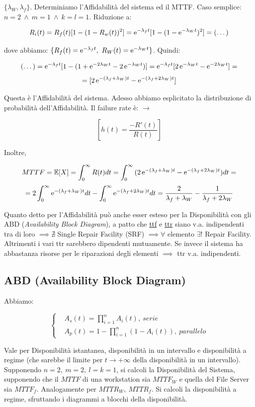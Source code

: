 $\{\lambda_W,\lambda_f\}$. Determiniamo l'Affidabilità del sistema ed il MTTF. Caso semplice: $n=2\ \land\ m=1\ \land\ k=l=1$. Riduzione a:

\[
	R_i(t) = R_f(t)[1-(1-R_w(t))^2] = \mathop{}\!\mathrm{e}^{-\lambda_ft}[1-(1-\mathop{}\!\mathrm{e}^{-\lambda_Wt})^2] = (\dots)
\]

dove abbiamo: $\{R_f(t)=\e^{-\lambda_ft},\ R_W(t)=\e^{-\lambda_Wt}\}$. Quindi:

\[
	(\dots) = \mathop{}\!\mathrm{e}^{-\lambda_ft}[1-(1+\mathop{}\!\mathrm{e}^{-2\lambda_Wt}-2\mathop{}\!\mathrm{e}^{-\lambda_Wt})] = \mathop{}\!\mathrm{e}^{-\lambda_ft}[2\mathop{}\!\mathrm{e}^{-\lambda_Wt} - \mathop{}\!\mathrm{e}^{-2\lambda_Wt}] =
\]
\[
	= [2\mathop{}\!\mathrm{e}^{-(\lambda_f+\lambda_W)t} - \mathop{}\!\mathrm{e}^{-(\lambda_f+2\lambda_W)t}]
\]

Questa è l'Affidabilità del sistema. Adesso abbiamo esplicitato la distribuzione di probabilità dell'Affidabilità. Il failure rate è: $\rightarrow$

\[
	[h(t) = \frac{-R'(t)}{R(t)}]
\]

Inoltre,

\[
	MTTF = \operatorname{\mathbb{E}}[X] = \int_0^\infty{R(t)dt} = \int_0^\infty{(2\mathop{}\!\mathrm{e}^{-(\lambda_f+\lambda_W)t} - \mathop{}\!\mathrm{e}^{-(\lambda_f+2\lambda_W)t})dt} =
\]
\[
	= 2\int_0^\infty{\mathop{}\!\mathrm{e}^{-(\lambda_f+\lambda_W)t}dt} -\int_0^\infty{\mathop{}\!\mathrm{e}^{-(\lambda_f+2\lambda_W)t}dt} = \frac{2}{\lambda_f+\lambda_W}-\frac{1}{\lambda_f+2\lambda_W}
\]

Quanto detto per l'Affidabilità può anche esser esteso per la Disponibilità con gli ABD (\textit{Availability Block Diagram}), a patto che \underline{ttf} e \underline{ttr} siano v.a. indipendenti tra di loro $\implies \nexists$ Single Repair Facility (SRF) $\implies \forall$ elemento $\exists!$ Repair Facility. Altrimenti i vari ttr sarebbero dipendenti mutuamente. Se invece il sistema ha abbastanza risorse per le riparazioni degli elementi $\implies$ ttr v.a. indipendenti.

\subsection{ABD (Availability Block Diagram)}

Abbiamo:

\[
	\left\{
	\begin{aligned}
	&A_s(t) = \prod_{i=1}^n{A_i(t)},\ serie\\
	&A_p(t) = 1-\prod_{i=1}^n{(1-A_i(t))},\ parallelo
	\end{aligned}
	\right.
\]

Vale per Disponibilità istantanea, disponibilità in un intervallo e disponibilità a regime (che sarebbe il limite per $t\to +\infty$ della disponibilità in un intervallo). Supponendo $n=2,\ m=2,\ l=k=1$, si calcoli la Disponibilità del Sistema, supponendo che il $MTTF$ di una workstation sia $MTTF_W$ e quella del File Server sia $MTTF_f$. Analogamente per $MTTR_W,\ MTTR_f$. Si calcoli la disponibilità a regime, sfruttando i diagrammi a blocchi della disponibilità. 

